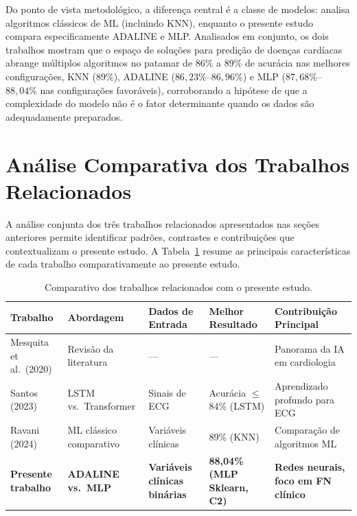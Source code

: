 Do ponto de vista metodológico, a diferença central é a classe de modelos:  analisa algoritmos clássicos de ML (incluindo KNN), enquanto o presente estudo compara especificamente ADALINE e MLP. Analisados em conjunto, os dois trabalhos mostram que o espaço de soluções para predição de doenças cardíacas abrange múltiplos algoritmos no patamar de 86\% a 89\% de acurácia nas melhores configurações, KNN ($89\%$), ADALINE ($86{,}23\%$--$86{,}96\%$) e MLP ($87{,}68\%$--$88{,}04\%$ nas configurações favoráveis), corroborando a hipótese de que a complexidade do modelo não é o fator determinante quando os dados são adequadamente preparados.


\section{An\'alise Comparativa dos Trabalhos Relacionados}

A an\'alise conjunta dos tr\^es trabalhos relacionados apresentados nas se\c c\~oes anteriores permite identificar padr\~oes, contrastes e contribui\c c\~oes que contextualizam o presente estudo. A Tabela~\ref{tab:trabalhos_relacionados} resume as principais caracter\'isticas de cada trabalho comparativamente ao presente estudo.

\begin{table}[H]
\centering
\caption{Comparativo dos trabalhos relacionados com o presente estudo.}
\label{tab:trabalhos_relacionados}
\begin{tabular}{|p{3.0cm}|p{2.3cm}|p{2.5cm}|p{2.0cm}|p{2.8cm}|}
\hline
\textbf{Trabalho} & \textbf{Abordagem} & \textbf{Dados de Entrada} & \textbf{Melhor Resultado} & \textbf{Contribui\c c\~ao Principal} \\
\hline
Mesquita et al.\ (2020) & Revis\~ao da literatura & --- & --- & Panorama da IA em cardiologia \\
\hline
Santos (2023) & LSTM vs.\ Transformer & Sinais de ECG & Acur\'acia $\leq$ 84\% (LSTM) & Aprendizado profundo para ECG \\
\hline
Ravani (2024) & ML cl\'assico comparativo & Vari\'aveis cl\'inicas & 89\% (KNN) & Compara\c c\~ao de algoritmos ML \\
\hline
\textbf{Presente trabalho} & \textbf{ADALINE vs.\ MLP} & \textbf{Vari\'aveis cl\'inicas bin\'arias} & \textbf{88,04\% (MLP Sklearn, C2)} & \textbf{Redes neurais, foco em FN cl\'inico} \\
\hline
\end{tabular}
\end{table}

